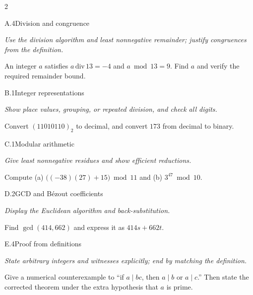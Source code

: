 \documentclass[9pt]{extarticle}
\begin{document}
\begin{multicols}{2}
\begin{CoreProblem}{A.4}{Division and congruence}
{\scriptsize\textit{Use the division algorithm and least nonnegative remainder; justify congruences from the definition.}\par}
An integer $a$ satisfies $a\,\mathrm{div}\,13=-4$ and $a\bmod13=9$.
Find $a$ and verify the required remainder bound.
\end{CoreProblem}
\begin{CoreProblem}{B.1}{Integer representations}
{\scriptsize\textit{Show place values, grouping, or repeated division, and check all digits.}\par}
Convert $(11010110)_2$ to decimal, and convert $173$ from decimal to binary.
\end{CoreProblem}
\begin{CoreProblem}{C.1}{Modular arithmetic}
{\scriptsize\textit{Give least nonnegative residues and show efficient reductions.}\par}
Compute (a) $\bigl((-38)(27)+15\bigr)\bmod11$ and
(b) $3^{47}\bmod10$.
\end{CoreProblem}
\columnbreak
\begin{CoreProblem}{D.2}{GCD and B\'ezout coefficients}
{\scriptsize\textit{Display the Euclidean algorithm and back-substitution.}\par}
Find $\gcd(414,662)$ and express it as $414s+662t$.
\end{CoreProblem}
\begin{CoreProblem}{E.4}{Proof from definitions}
{\scriptsize\textit{State arbitrary integers and witnesses explicitly; end by matching the definition.}\par}
Give a numerical counterexample to ``if $a\mid bc$, then $a\mid b$ or
$a\mid c$.'' Then state the corrected theorem under the extra hypothesis that
$a$ is prime.
\end{CoreProblem}
\end{multicols}
\CoreWorkArea
\FormBreak
{}
\end{document}
